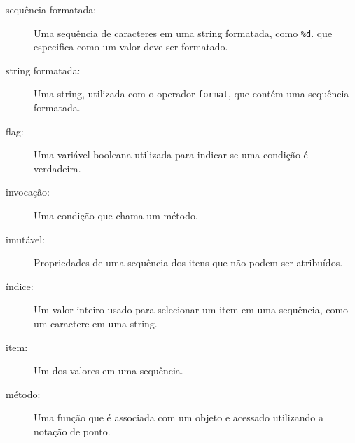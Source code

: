 {\begin{description}
\item[sequência formatada:] Uma sequência de caracteres em uma string formatada,
	como {\tt \%d}. que especifica como um valor deve ser formatado.


\item[string formatada:] Uma string, utilizada com o operador {\tt format},
	que contém uma sequência formatada.


\item[flag:] Uma variável booleana utilizada para indicar se uma condição é
	verdadeira.

\item[invocação:] Uma condição que chama um método.

\item[imutável:] Propriedades de uma sequência dos itens que não podem ser
	atribuídos.

\item[índice:] Um valor inteiro usado para selecionar um item em uma sequência,
	como um caractere em uma string.


\item[item:] Um dos valores em uma sequência.

\item[método:] Uma função que é associada com um objeto e acessado utilizando
	a notação de ponto.


\end{description}}
